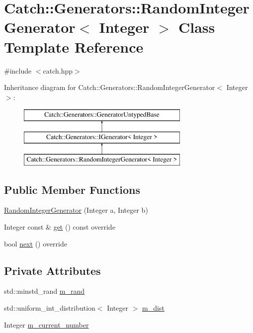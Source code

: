 \hypertarget{class_catch_1_1_generators_1_1_random_integer_generator}{}\section{Catch\+::Generators\+::Random\+Integer\+Generator$<$ Integer $>$ Class Template Reference}
\label{class_catch_1_1_generators_1_1_random_integer_generator}


{\ttfamily \#include $<$catch.\+hpp$>$}

Inheritance diagram for Catch\+::Generators\+::Random\+Integer\+Generator$<$ Integer $>$\+:\begin{figure}[H]
\begin{center}
\leavevmode
\includegraphics[height=3.000000cm]{class_catch_1_1_generators_1_1_random_integer_generator}
\end{center}
\end{figure}
\subsection*{Public Member Functions}
\begin{DoxyCompactItemize}
\item 
\mbox{\hyperlink{class_catch_1_1_generators_1_1_random_integer_generator_a886d16c899ad70781b83a0e8f9d2cf96}{Random\+Integer\+Generator}} (Integer a, Integer b)
\item 
Integer const  \& \mbox{\hyperlink{class_catch_1_1_generators_1_1_random_integer_generator_aafbdf9028762f5e8f8ca9c317d686fca}{get}} () const override
\item 
bool \mbox{\hyperlink{class_catch_1_1_generators_1_1_random_integer_generator_aaa3db70fbdfa3e8dcb61fb5592eba81f}{next}} () override
\end{DoxyCompactItemize}
\subsection*{Private Attributes}
\begin{DoxyCompactItemize}
\item 
std\+::minstd\+\_\+rand \mbox{\hyperlink{class_catch_1_1_generators_1_1_random_integer_generator_a8b64ca60f4711c9e29a68090ebdc1b94}{m\+\_\+rand}}
\item 
std\+::uniform\+\_\+int\+\_\+distribution$<$ Integer $>$ \mbox{\hyperlink{class_catch_1_1_generators_1_1_random_integer_generator_a0f9a8e409e291c332ebba1667cdc90fe}{m\+\_\+dist}}
\item 
Integer \mbox{\hyperlink{class_catch_1_1_generators_1_1_random_integer_generator_a1b811ebf04416b6b822ce153b040f020}{m\+\_\+current\+\_\+number}}
\end{DoxyCompactItemize}
